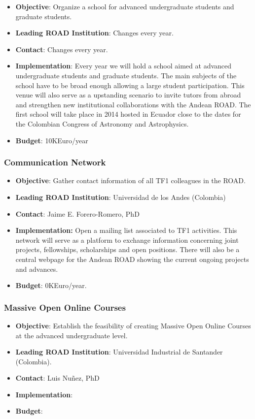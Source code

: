 \documentclass[12pt]{article}
\begin{document}
\begin{itemize}

\item{\bf Objective}: Organize a school for advanced undergraduate
  students and graduate students.
\item{\bf Leading ROAD Institution}: Changes every year.
\item{\bf Contact}: Changes every year.
\item{\bf Implementation}:
Every year we will hold a school aimed at
  advanced undergraduate students and graduate students. The main
  subjects of the school have to be broad enough allowing a large
  student participation. This venue will also serve as a upstanding
  scenario to invite tutors from abroad and strengthen new
  institutional collaborations with the Andean ROAD. The first school
  will take place in 2014 hosted in Ecuador close to the dates for the
  Colombian Congress of Astronomy and Astrophysics.  
\item{\bf Budget}: 10KEuro/year
\end{itemize}

\subsubsection{Communication Network}
\begin{itemize}
  \item{\bf Objective}: Gather contact information of all TF1 colleagues in
    the ROAD.
  \item{\bf Leading ROAD Institution}: Universidad de los Andes (Colombia)
  \item{\bf Contact}: Jaime E. Forero-Romero, PhD
  \item{\bf Implementation:} Open a mailing list associated to TF1
    activities. This network will serve as a platform to exchange
    information concerning joint projects, fellowships, scholarships
    and open positions. There will also be a central webpage for the
    Andean ROAD showing the current ongoing projects and advances.
  \item{\bf Budget}: 0KEuro/year.
\end{itemize}

\subsubsection{Massive Open Online Courses}
\begin{itemize}
\item{\bf Objective}: Establish the feasibility of creating Massive Open
Online Courses at the advanced undergraduate level.
\item{\bf Leading ROAD Institution}: Universidad Industrial de
  Santander (Colombia).  
\item{\bf Contact}: Luis Nu\~nez, PhD
\item{\bf Implementation}: 
\item{\bf Budget}:
\end{itemize}
\end{document}
